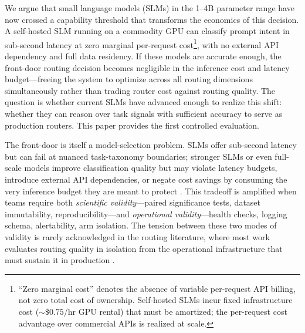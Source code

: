 \documentclass{article}
\begin{document}
We argue that small language models (SLMs) in the 1--4B parameter range have now crossed a capability threshold that transforms the economics of this decision. A self-hosted SLM running on a commodity GPU can classify prompt intent in sub-second latency at zero marginal per-request cost\footnote{``Zero marginal cost'' denotes the absence of variable per-request API billing, not zero total cost of ownership. Self-hosted SLMs incur fixed infrastructure cost (${\sim}\$0.75$/hr GPU rental) that must be amortized; the per-request cost advantage over commercial APIs is realized at scale.}, with no external API dependency and full data residency. If these models are accurate enough, the front-door routing decision becomes negligible in the inference cost and latency budget---freeing the system to optimize across all routing dimensions simultaneously rather than trading router cost against routing quality. The question is whether current SLMs have advanced enough to realize this shift: whether they can reason over task signals with sufficient accuracy to serve as production routers. This paper provides the first controlled evaluation.

The front-door is itself a model-selection problem. SLMs offer sub-second latency but can fail at nuanced task-taxonomy boundaries; stronger SLMs or even full-scale models improve classification quality but may violate latency budgets, introduce external API dependencies, or negate cost savings by consuming the very inference budget they are meant to protect \citep{chen2023frugalgpt}. This tradeoff is amplified when teams require both \emph{scientific validity}---paired significance tests, dataset immutability, reproducibility---and \emph{operational validity}---health checks, logging schema, alertability, arm isolation. The tension between these two modes of validity is rarely acknowledged in the routing literature, where most work evaluates routing quality in isolation from the operational infrastructure that must sustain it in production \citep{madaan2023automix}.
\end{document}
